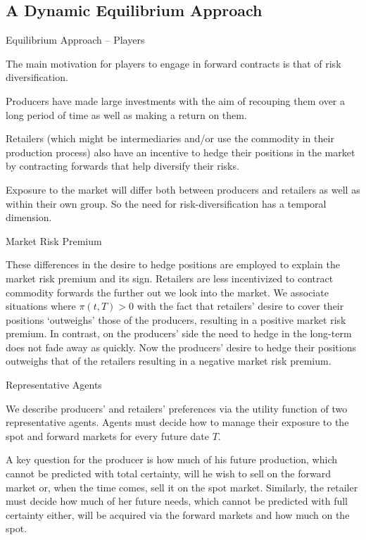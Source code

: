 \subsection{A Dynamic Equilibrium Approach}

{Equilibrium Approach -- Players}



The main
motivation for players to engage in forward contracts is that of
risk diversification.

Producers have made large investments with the
aim of recouping them over a long period of time as well as making a
return on them.

Retailers (which might be intermediaries and/or use the commodity in
their production process) also have an incentive to hedge their
positions in the market by contracting forwards that help diversify
their risks.

Exposure to the market will differ both between producers and
retailers as well as within their own group.
So the need for risk-diversification has a temporal dimension.



{Market Risk Premium}


 These differences in the
desire to hedge positions are employed to explain the market risk premium and
its sign.
 Retailers are less incentivized to contract commodity forwards
the further out we look into the market. We associate situations where
$\pi(t,T)>0$ with the fact that retailers' desire to cover their
positions `outweighs' those of the producers, resulting in a
positive market risk premium.
 In contrast, on the producers' side the need to hedge in the long-term
does not fade away as quickly. Now the producers' desire to hedge their positions outweighs that of the retailers resulting in a negative market risk premium.





{Representative Agents}


 We describe producers' and retailers'
preferences via the utility function of two representative agents.
 Agents
must decide how to manage their exposure to the spot and forward
markets for every future date $T$.

A key question for the producer
is how much of his future production, which cannot be predicted with
total certainty, will he wish to sell on the forward market or, when
the time comes, sell it on the spot market.
 Similarly, the retailer
must decide how much of her future needs, which cannot be predicted
with full certainty either, will be acquired via the forward markets
and how much on the spot.


